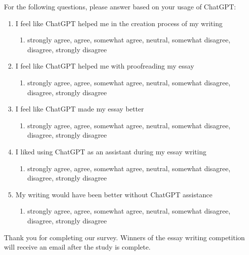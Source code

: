 \documentclass[sigconf]{acmart}
\begin{document}
    
    For the following questions, please answer based on your usage of ChatGPT:
    
    \begin{enumerate}
        \item I feel like ChatGPT helped me in the creation process of my writing
        \begin{enumerate}
            \item strongly agree, agree, somewhat agree, neutral, somewhat disagree, disagree, strongly disagree
        \end{enumerate}
        \item I feel like ChatGPT helped me with proofreading my essay
        \begin{enumerate}
            \item strongly agree, agree, somewhat agree, neutral, somewhat disagree, disagree, strongly disagree
        \end{enumerate}
        \item I feel like ChatGPT made my essay better
        \begin{enumerate}
            \item strongly agree, agree, somewhat agree, neutral, somewhat disagree, disagree, strongly disagree
        \end{enumerate}
        \item I liked using ChatGPT as an assistant during my essay writing
        \begin{enumerate}
            \item strongly agree, agree, somewhat agree, neutral, somewhat disagree, disagree, strongly disagree
        \end{enumerate}
        \item My writing would have been better without ChatGPT assistance
        \begin{enumerate}
            \item strongly agree, agree, somewhat agree, neutral, somewhat disagree, disagree, strongly disagree
        \end{enumerate}
    \end{enumerate}
    
    Thank you for completing our survey. Winners of the essay writing competition will receive an email after the study is complete.
    
\end{document}
